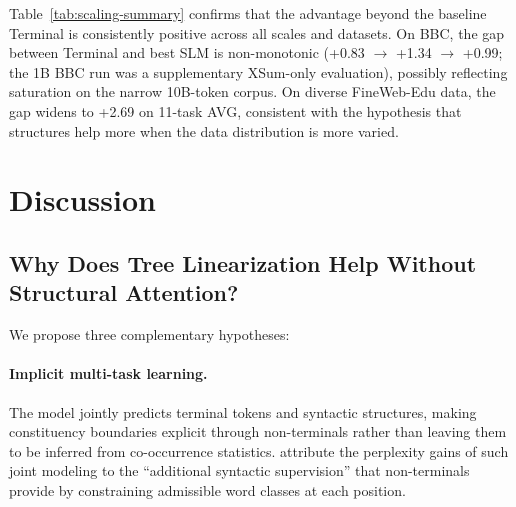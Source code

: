 \documentclass[11pt]{article}
\begin{document}
Table~\ref{tab:scaling-summary} confirms that the advantage beyond the baseline Terminal is consistently positive across all scales and datasets.
On BBC, the gap between Terminal and best SLM is non-monotonic (+0.83 $\rightarrow$ +1.34 $\rightarrow$ +0.99; the 1B BBC run was a supplementary XSum-only evaluation), possibly reflecting saturation on the narrow 10B-token corpus.
On diverse FineWeb-Edu data, the gap widens to +2.69 on 11-task AVG, consistent with the hypothesis that structures help more when the data distribution is more varied.


\section{Discussion}

\subsection{Why Does Tree Linearization Help Without Structural Attention?}
\label{sec:why-works}

We propose three complementary hypotheses:

\paragraph{Implicit multi-task learning.} The model jointly predicts terminal tokens and syntactic structures, making constituency boundaries explicit through non-terminals rather than leaving them to be inferred from co-occurrence statistics. \citet{sartran-etal-2022-transformer} attribute the perplexity gains of such joint modeling to the ``additional syntactic supervision'' that non-terminals provide by constraining admissible word classes at each position.
\end{document}
